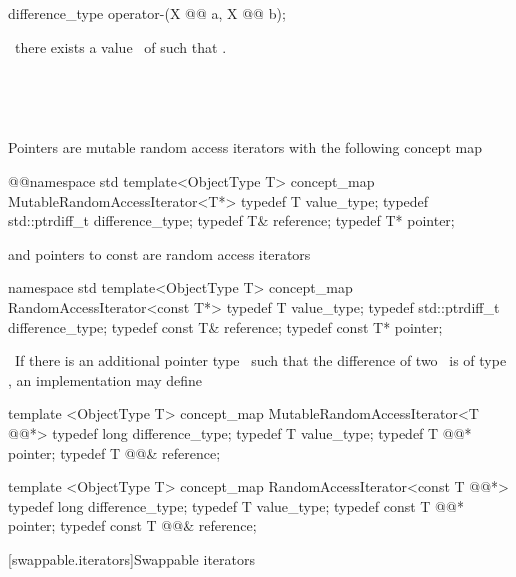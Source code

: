 \documentclass[american,twoside]{book}
\begin{document}
\begin{itemdecl}
difference_type operator-(X @@ a, X @@ b);
\end{itemdecl}

\pnum
\precondition\
there exists a value \ of  such that .

\pnum
\effects\

\pnum
\returns\

\pnum
Pointers are mutable random access iterators with the following
concept map

\begin{codeblock}
@\textcolor{addclr}{}@namespace std {
  template<ObjectType T> concept_map MutableRandomAccessIterator<T*> {
    typedef T value_type;
    typedef std::ptrdiff_t difference_type;
    typedef T& reference;
    typedef T* pointer;
  }
}
\end{codeblock}

and pointers to const are random access iterators

\begin{codeblock}
namespace std {
  template<ObjectType T> concept_map RandomAccessIterator<const T*> {
    typedef T value_type;
    typedef std::ptrdiff_t difference_type;
    typedef const T& reference;
    typedef const T* pointer;
  }
}
\end{codeblock}

\pnum
\enternote\ 
If there is an additional pointer type
\
such that the difference of two
\
is of type
\tcode{long},
an implementation may define

\color{addclr}
\begin{codeblock}
  template <ObjectType T> concept_map MutableRandomAccessIterator<T @@*> {
    typedef long difference_type;
    typedef T value_type;
    typedef T @@* pointer;
    typedef T @@& reference;
  }

  template <ObjectType T> concept_map RandomAccessIterator<const T @@*> {
    typedef long difference_type;
    typedef T value_type;
    typedef const T @@* pointer;
    typedef const T @\xname{far}@& reference;
  }
\end{codeblock}
\textcolor{addclr}{\exitnote}
\color{black}

\editorial{Add the following new section}

\rSec2[swappable.iterators]{Swappable iterators}
\pnum
{}
\end{document}
